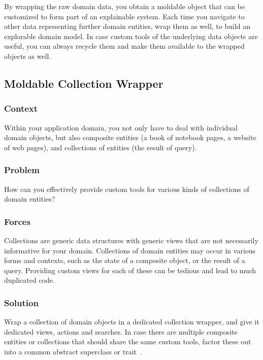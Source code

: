 \documentclass[sigconf]{acmart}
\begin{document}
By wrapping the raw domain data, you obtain a moldable object that can be customized to form part of an explainable system.
Each time you navigate to other data representing further domain entities, wrap them as well, to build an explorable domain model.
In case custom tools of the underlying data objects are useful, you can always recycle them and make them available to the wrapped objects as well.

\subsection*{Moldable Collection Wrapper}\label{pat:collectionWrapper}

\subsubsection*{Context}
Within your application domain, you not only have to deal with individual domain objects, but also composite entities (\eg a book of notebook pages, a website of web pages), and collections of entities (\eg the result of query).

\subsubsection*{Problem}
How can you effectively provide custom tools for various kinds of collections of domain entities?

\subsubsection*{Forces}
Collections are generic data structures with generic views that are not necessarily informative for your domain.
Collections of domain entities may occur in various forms and contexts, such as the state of a composite object, or the result of a query.
Providing custom views for each of these can be tedious and lead to much duplicated code.

\subsubsection*{Solution}
Wrap a collection of domain objects in a dedicated collection wrapper, and give it dedicated views, actions and searches.
In case there are multiple composite entities or collections that should share the same custom tools, factor these out into a common abstract superclass or trait~\cite{Duca06b}.
\end{document}
